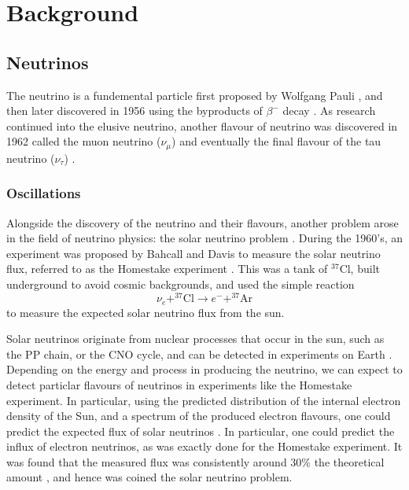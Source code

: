 \chapter{Background}\label{ch:Background}

\section{Neutrinos}

The neutrino is a fundemental particle first proposed by Wolfgang Pauli \cite{nu_proposition}, and then later discovered in 1956 using the byproducts of $\beta^{-}$ decay \cite{aneut}. As research continued into the elusive neutrino, another flavour of neutrino was discovered in 1962 called the muon neutrino ($\nu_{\mu}$) \cite{m_nu} and eventually the final flavour of the tau neutrino ($\nu_\tau$) \cite{t_nu}. 

\subsection{Oscillations}\label{subsec:osc}

Alongside the discovery of the neutrino and their flavours, another problem arose in the field of neutrino physics: the solar neutrino problem \cite{lowe_nu}. During the 1960's, an experiment was proposed by Bahcall and Davis to measure the solar neutrino flux, referred to as the Homestake experiment \cite{davis, bahcall}. This was a tank of $^{37}$Cl, built underground to avoid cosmic backgrounds, and used the simple reaction\cite{davis, bahcall}
\begin{equation}\label{eq:cl}
  \nu_{e} + ^{37}\text{Cl} \to e^{-} + ^{37}\text{Ar}
\end{equation}
to measure the expected solar neutrino flux from the sun. 

Solar neutrinos originate from nuclear processes that occur in the sun, such as the PP chain, or the CNO cycle, and can be detected in experiments on Earth \cite{solar_nu}. Depending on the energy and process in producing the neutrino, we can expect to detect particlar flavours of neutrinos in experiments like the Homestake experiment. In particular, using the predicted distribution of the internal electron density of the Sun, and a spectrum of the produced electron flavours, one could predict the expected flux of solar neutrinos \cite{solar_nu}. In particular, one could predict the influx of electron neutrinos, as was exactly done for the Homestake experiment. It was found that the measured flux was consistently around 30\% the theoretical amount \cite{davis, bahcall, solar_nu}, and hence was coined the solar neutrino problem.

